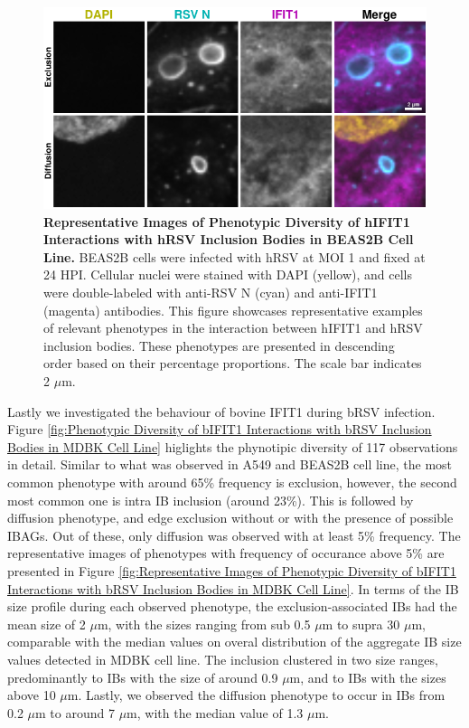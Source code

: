 \begin{figure}
    \centering
    \includegraphics[width=1\linewidth]{08. Chapter 3/Figs/02. Infection/01. IFIT1/06. beas2b i1.pdf}
    \caption[Representative Images of Phenotypic Diversity of hIFIT1 Interactions with hRSV Inclusion Bodies in BEAS2B Cell Line.]{\textbf{Representative Images of Phenotypic Diversity of hIFIT1 Interactions with hRSV Inclusion Bodies in BEAS2B Cell Line.} BEAS2B cells were infected with hRSV at MOI 1 and fixed at 24 HPI. Cellular nuclei were stained with DAPI (yellow), and cells were double-labeled with anti-RSV N (cyan) and anti-IFIT1 (magenta) antibodies. This figure showcases representative examples of relevant phenotypes in the interaction between hIFIT1 and hRSV inclusion bodies. These phenotypes are presented in descending order based on their percentage proportions. The scale bar indicates 2 \(\mu \mbox{m}\).}
    \label{fig:Representative Images of Phenotypic Diversity of hIFIT1 Interactions with hRSV Inclusion Bodies in BEAS2B Cell Line}
\end{figure}

Lastly we investigated the behaviour of bovine IFIT1 during bRSV infection. Figure \ref{fig:Phenotypic Diversity of bIFIT1 Interactions with bRSV Inclusion Bodies in MDBK Cell Line} higlights the phynotipic diversity of 117 observations in detail. Similar to what was observed in A549 and BEAS2B cell line, the most common phenotype with around 65\% frequency is exclusion, however, the second most common one is intra IB inclusion (around 23\%). This is followed by diffusion phenotype, and edge exclusion without or with the presence of possible IBAGs. Out of these, only diffusion was observed with at least 5\% frequency. The representative images of phenotypes with frequency of occurance above 5\% are presented in Figure \ref{fig:Representative Images of Phenotypic Diversity of bIFIT1 Interactions with bRSV Inclusion Bodies in MDBK Cell Line}. In terms of the IB size profile during each observed phenotype, the exclusion-associated IBs had the mean size of 2 \(\mu \mbox{m}\), with the sizes ranging from sub 0.5 \(\mu \mbox{m}\) to supra 30 \(\mu \mbox{m}\), comparable with the median values on overal distribution of the aggregate IB size values detected in MDBK cell line. The inclusion clustered in two size ranges, predominantly to IBs with the size of around 0.9 \(\mu \mbox{m}\), and to IBs with the sizes above 10 \(\mu \mbox{m}\). Lastly, we observed the diffusion phenotype to occur in IBs from 0.2 \(\mu \mbox{m}\) to around 7 \(\mu \mbox{m}\), with the median value of 1.3 \(\mu \mbox{m}\).

